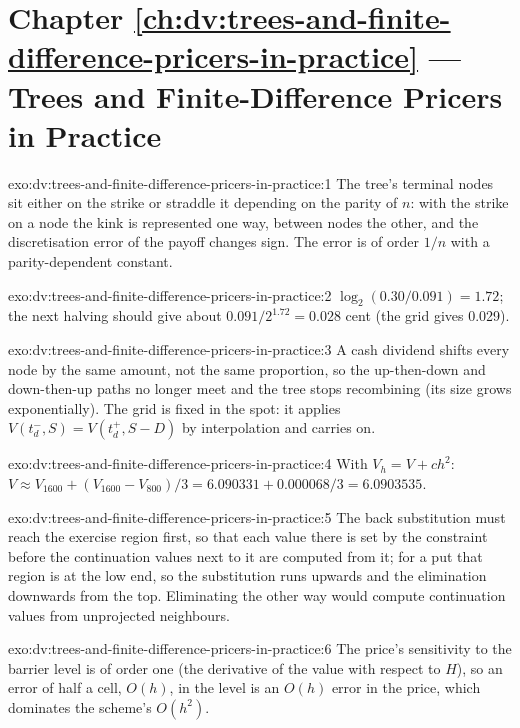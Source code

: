\section*{Chapter \ref{ch:dv:trees-and-finite-difference-pricers-in-practice} --- Trees and Finite-Difference Pricers in Practice}

\begin{solution}{exo:dv:trees-and-finite-difference-pricers-in-practice:1}
The tree's terminal nodes sit either on the strike or straddle it depending on the parity of $n$: with the strike on a node the kink is
represented one way, between nodes the other, and the discretisation error of the payoff changes sign. The error is of order $1/n$ with a
parity-dependent constant.
\end{solution}

\begin{solution}{exo:dv:trees-and-finite-difference-pricers-in-practice:2}
$\log_2(0.30/0.091)=1.72$; the next halving should give about $0.091/2^{1.72}=0.028$ cent (the grid gives 0.029).
\end{solution}

\begin{solution}{exo:dv:trees-and-finite-difference-pricers-in-practice:3}
A cash dividend shifts every node by the same amount, not the same proportion, so the up-then-down and down-then-up paths no longer meet and the
tree stops recombining (its size grows exponentially). The grid is fixed in the spot: it applies $V(t_d^-,S)=V(t_d^+,S-D)$ by interpolation and
carries on.
\end{solution}

\begin{solution}{exo:dv:trees-and-finite-difference-pricers-in-practice:4}
With $V_h=V+ch^2$: $V\approx V_{1600}+(V_{1600}-V_{800})/3=6.090331+0.000068/3=6.0903535$.
\end{solution}

\begin{solution}{exo:dv:trees-and-finite-difference-pricers-in-practice:5}
The back substitution must reach the exercise region first, so that each value there is set by the constraint before the continuation values
next to it are computed from it; for a put that region is at the low end, so the substitution runs upwards and the elimination downwards from the
top. Eliminating the other way would compute continuation values from unprojected neighbours.
\end{solution}

\begin{solution}{exo:dv:trees-and-finite-difference-pricers-in-practice:6}
The price's sensitivity to the barrier level is of order one (the derivative of the value with respect to $H$), so an error of half a cell, $O(h)$,
in the level is an $O(h)$ error in the price, which dominates the scheme's $O(h^2)$.
\end{solution}

